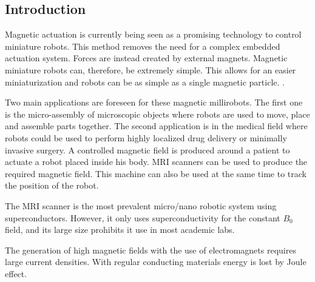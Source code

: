 \documentclass{ws-jmrr}
\begin{document}
\begin{multicols}{2}

%



\section{Introduction}

Magnetic actuation is currently being seen as a promising technology to control miniature robots. This method removes the need for a complex embedded actuation system. Forces are instead created by external magnets. Magnetic miniature robots can, therefore, be extremely simple. This allows for an easier miniaturization and robots can be as simple as a single magnetic particle.  \cite{sitti2015biomedical}.\par
Two main applications are foreseen for these magnetic millirobots. The first one is the micro-assembly of microscopic objects where robots are used to move, place and assemble parts together. The second application is in the medical field where robots could be used to perform highly localized drug delivery or minimally invasive surgery. A controlled magnetic field is produced around a patient to actuate a robot placed inside his body. MRI scanners can be used to produce the required magnetic field. This machine can also be used at the same time to track the position of the robot.\par
The MRI scanner is the most prevalent micro/nano robotic system using superconductors. However, it only uses superconductivity for the constant $B_0$ field, and its large size prohibits it use in most academic labs.\par
The generation of high magnetic fields with the use of electromagnets requires large current densities. With regular conducting materials energy is lost by Joule effect.
\begin{figurehere}
\begin{center}

\end{center}
\end{figurehere}
\end{multicols}
\end{document}
